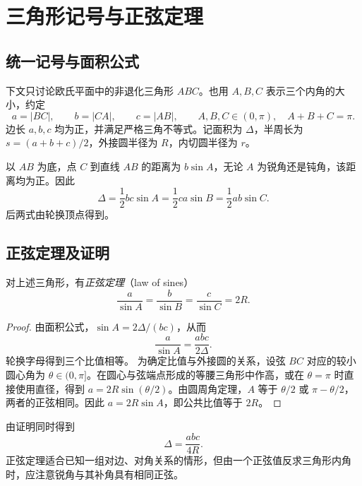 \documentclass[UTF8,12pt,a4paper,fontset=fandol]{ctexart}
\begin{document}
\section{三角形记号与正弦定理}
\label{sec:trig-sine-law}

\subsection{统一记号与面积公式}

下文只讨论欧氏平面中的非退化三角形 $ABC$。也用 $A,B,C$ 表示三个内角的大小，约定
\[
  a=|BC|,\qquad b=|CA|,\qquad c=|AB|,\qquad
  A,B,C\in(0,\pi),\quad A+B+C=\pi.
\]
边长 $a,b,c$ 均为正，并满足严格三角不等式。记面积为 $\Delta$，半周长为 $s=(a+b+c)/2$，外接圆半径为 $R$，内切圆半径为 $r$。

以 $AB$ 为底，点 $C$ 到直线 $AB$ 的距离为 $b\sin A$，无论 $A$ 为锐角还是钝角，该距离均为正。因此
\begin{equation}\label{eq:trig-area}
  \boxed{\Delta=\frac12bc\sin A
  =\frac12ca\sin B=\frac12ab\sin C}.
\end{equation}
后两式由轮换顶点得到。

\subsection{正弦定理及证明}

\begin{theorem}[正弦定理]
对上述三角形，有\emph{正弦定理}（law of sines）
\begin{equation}\label{eq:trig-sine-law}
  \boxed{\frac a{\sin A}=\frac b{\sin B}=\frac c{\sin C}=2R}.
\end{equation}
\end{theorem}

\begin{proof}
由面积公式，$\sin A=2\Delta/(bc)$，从而
\[
  \frac a{\sin A}=\frac{abc}{2\Delta}.
\]
轮换字母得到三个比值相等。
为确定比值与外接圆的关系，设弦 $BC$ 对应的较小圆心角为 $\theta\in(0,\pi]$。在圆心与弦端点形成的等腰三角形中作高，或在 $\theta=\pi$ 时直接使用直径，得到 $a=2R\sin(\theta/2)$。由圆周角定理，$A$ 等于 $\theta/2$ 或 $\pi-\theta/2$，两者的正弦相同。因此 $a=2R\sin A$，即公共比值等于 $2R$。
\end{proof}

由证明同时得到
\begin{equation}\label{eq:trig-circum-area}
  \Delta=\frac{abc}{4R}.
\end{equation}
正弦定理适合已知一组对边、对角关系的情形，但由一个正弦值反求三角形内角时，应注意锐角与其补角具有相同正弦。
\end{document}
